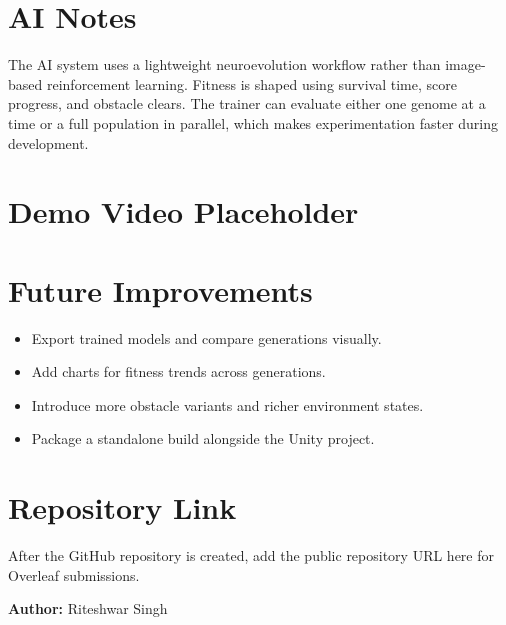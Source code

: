 \documentclass[11pt]{article}
\begin{document}
\section{AI Notes}
The AI system uses a lightweight neuroevolution workflow rather than image-based reinforcement learning. Fitness is shaped using survival time, score progress, and obstacle clears. The trainer can evaluate either one genome at a time or a full population in parallel, which makes experimentation faster during development.

\section{Demo Video Placeholder}
\noindent{}

\section{Future Improvements}
\begin{itemize}[leftmargin=1.5em]
    \item Export trained models and compare generations visually.
    \item Add charts for fitness trends across generations.
    \item Introduce more obstacle variants and richer environment states.
    \item Package a standalone build alongside the Unity project.
\end{itemize}

\section{Repository Link}
After the GitHub repository is created, add the public repository URL here for Overleaf submissions.

\vfill
\noindent\textbf{Author:} Riteshwar Singh
\end{document}
